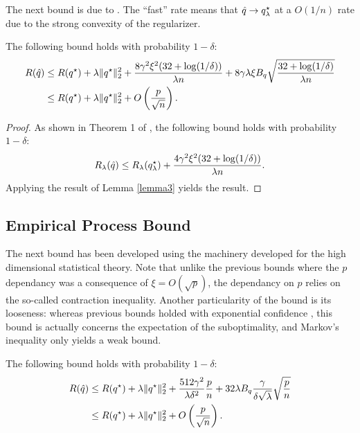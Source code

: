 \documentclass{article}
\begin{document}
The next bound is due to \cite{sridharan2009fast}. The ``fast'' rate means that
$\hat q\to q^\star_\lambda$ at a $O(1/n)$ rate due to the strong convexity of the regularizer.

\begin{thm}
  The following bound holds with probability $1-\delta$:
  \begin{align*}
    R(\hat q) &\leq R(q^\star) + \lambda\|q^\star\|^2_2 +
    \frac{8\gamma^2\xi^2(32+\log(1/\delta))}{\lambda n}
             + 8\gamma\lambda\xi B_q \sqrt{\frac{32+\log(1/\delta)}{\lambda n}}\\
           &\leq R(q^\star) + \lambda\|q^\star\|^2_2 + O\left(\frac{p}{\sqrt{n}}\right).
  \end{align*}
\end{thm}

\begin{proof}
  As shown in Theorem 1 of \cite{sridharan2009fast}, the following bound holds with
  probability $1-\delta$:
  \[
    R_\lambda(\hat q) \leq R_\lambda(q^\star_\lambda) + \frac{4\gamma^2\xi^2(32+\log(1/\delta))}{\lambda n}.
  \]
  Applying the result of Lemma \ref{lemma3} yields the result. 
\end{proof}

\subsection{Empirical Process Bound}

The next bound has been developed using the machinery developed for the high dimensional
statistical theory. Note that unlike the previous bounds where the $p$ dependancy was a
consequence of $\xi = O(\sqrt{p})$, the dependancy on $p$ relies on the so-called
contraction inequality. Another particularity of the bound is its looseness: whereas
previous bounds holded with exponential confidence , this bound is
actually concerns the expectation of the suboptimality, and Markov's inequality only
yields a weak bound.

\begin{thm}
  The following bound holds with probability $1-\delta$:
  \begin{align*}
    R(\hat q) &\leq R(q^\star) + \lambda\|q^\star\|_2^2 +
             \frac{512\gamma^2}{\lambda\delta^2}\frac{p}{n} + 32\lambda
             B_q\frac{\gamma}{\delta\sqrt{\lambda}}\sqrt{\frac{p}{n}}\\
    &\leq R(q^\star) + \lambda\|q^\star\|_2^2 + O\left(\frac{p}{\sqrt{n}}\right).
  \end{align*}
\end{thm}
\end{document}
